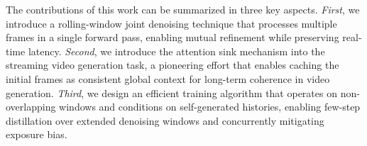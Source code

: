 The contributions of this work can be summarized in three key aspects. \textit{First}, we introduce a rolling-window joint denoising technique that processes multiple frames in a single forward pass, enabling mutual refinement while preserving real-time latency. \textit{Second}, we introduce the attention sink mechanism into the streaming video generation task, a pioneering effort that enables caching the initial frames as consistent global context for long-term coherence in video generation. \textit{Third}, we design an efficient training algorithm that operates on non-overlapping windows and conditions on self-generated histories, enabling few-step distillation over extended denoising windows and concurrently mitigating exposure bias.
